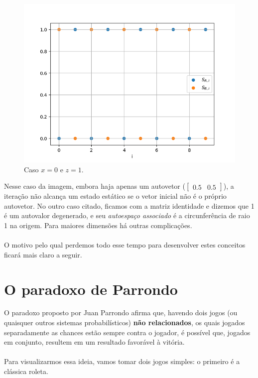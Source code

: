 \documentclass[12pt]{article}
\begin{document}
\begin{figure}[H]
\centering
\includegraphics[scale=0.6]{graph3.png}
\caption{Caso $x = 0$ e $z = 1$.}
\end{figure}

Nesse caso da imagem, embora haja apenas um autovetor ($\begin{bmatrix} 0.5 & 0.5 \end{bmatrix}$), a iteração não alcança um estado estático se o vetor inicial não é o próprio autovetor. No outro caso citado, ficamos com a matriz identidade e dizemos que 1 é um autovalor degenerado, e seu \textit{autoespaço associado} é a circunferência de raio 1 na origem. Para maiores dimensões há outras complicações.\\
\\
O motivo pelo qual perdemos todo esse tempo para desenvolver estes conceitos ficará mais claro a seguir.

\section{O paradoxo de Parrondo}

O paradoxo proposto por Juan Parrondo afirma que, havendo dois jogos (ou quaisquer outros sistemas probabilísticos) \textbf{não relacionados}, os quais jogados separadamente as chances estão sempre contra o jogador, é possível que, jogados em conjunto, resultem em um resultado favorável à vitória.\\
\\
Para visualizarmos essa ideia, vamos tomar dois jogos simples: o primeiro é a clássica roleta.
\end{document}
